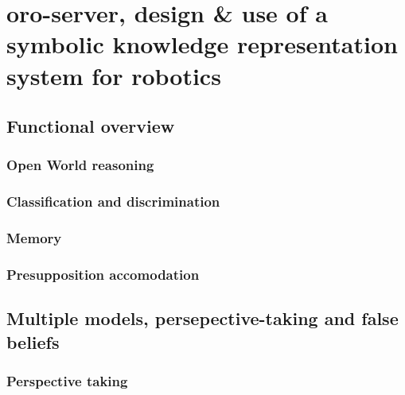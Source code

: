 \chapter{oro-server, design \& use of a symbolic knowledge representation system for robotics}
\label{chapter|oroserver}


\section{Functional overview}
\label{sect|functional-overview}


\subsection{ Open World reasoning}
\label{sect|open-world-reasoning}

\subsection{Classification and discrimination}
\label{subssect|discrimination}

\subsection{Memory}
\label{subssect|memory}

\subsection{Presupposition accomodation}
\label{sect|presupposition-accomodation}



\section{Multiple models, persepective-taking and false beliefs}
\label{subssect|alterite}

\subsection{Perspective taking}
\label{subssect|perspective-taking}

